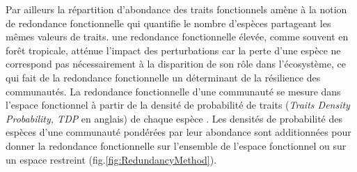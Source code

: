 \documentclass[
  11pt,
  french,
  A4paper,
  extrafontsizes,onecolumn,openright
  ]{memoir}
\begin{document}
Par ailleurs la répartition d'abondance des traits fonctionnels amène à
la notion de redondance fonctionnelle qui quantifie le nombre d'espèces
partageant les mêmes valeurs de traits. une redondance fonctionnelle
élevée, comme souvent en forêt tropicale, atténue l'impact des
perturbations car la perte d'une espèce ne correspond pas nécessairement
à la disparition de son rôle dans l'écosystème, ce qui fait de la
redondance fonctionnelle un déterminant de la résilience des
communautés. La redondance fonctionnelle d'une communauté se mesure dans
l'espace fonctionnel à partir de la densité de probabilité de traits
(\emph{Traits Density Probability, TDP} en anglais) de chaque espèce
\autocite{Carmona2016}. Les densités de probabilité des espèces d'une
communauté pondérées par leur abondance sont additionnées pour donner la
redondance fonctionnelle sur l'ensemble de l'espace fonctionnel ou sur
un espace restreint (fig.\ref{fig:RedundancyMethod}).
\end{document}
